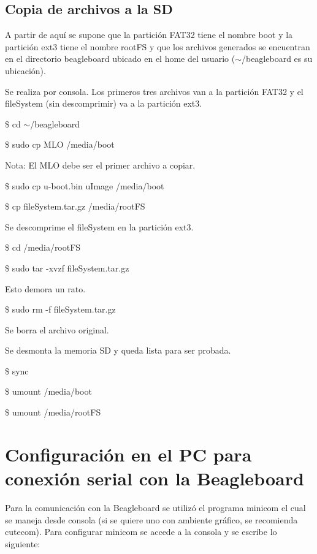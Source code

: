 \subsection{Copia de archivos a la SD}

A partir de aquí se supone que la partición FAT32 tiene el nombre boot y la partición ext3 tiene el nombre rootFS y que los archivos generados se encuentran en el directorio beagleboard ubicado en el home del usuario ($\sim$/beagleboard es su ubicación).

\bigskip
Se realiza por consola. 
Los primeros tres archivos van a la partición FAT32 y el fileSystem (sin descomprimir) va a la 
partición ext3.

\bigskip
\centerline{\$ cd $\sim$/beagleboard}

\centerline{\$ sudo cp MLO /media/boot} 

Nota: El MLO debe ser el primer archivo a copiar.

\bigskip
\centerline{\$ sudo cp u-boot.bin uImage /media/boot}

\centerline{\$ cp fileSystem.tar.gz /media/rootFS}

\bigskip
Se descomprime el fileSystem en la partición ext3.

\bigskip
\centerline{\$ cd /media/rootFS}

\centerline{\$ sudo tar -xvzf fileSystem.tar.gz}

Esto demora un rato.

\centerline{\$ sudo rm -f fileSystem.tar.gz}

Se borra el archivo original.

\bigskip
Se desmonta la memoria SD y queda lista para ser probada. 

\bigskip
\centerline{\$ sync}

\centerline{\$ umount /media/boot}

\centerline{\$ umount /media/rootFS}

\newpage
\section{Configuración en el PC para conexión serial con la Beagleboard}\label{serialBb}

\bigskip
Para la comunicación con la Beagleboard se utilizó el programa minicom el cual se maneja 
desde consola (si se quiere uno con ambiente gráfico, se recomienda cutecom). 
Para configurar minicom se accede a la consola y se escribe lo siguiente: 

